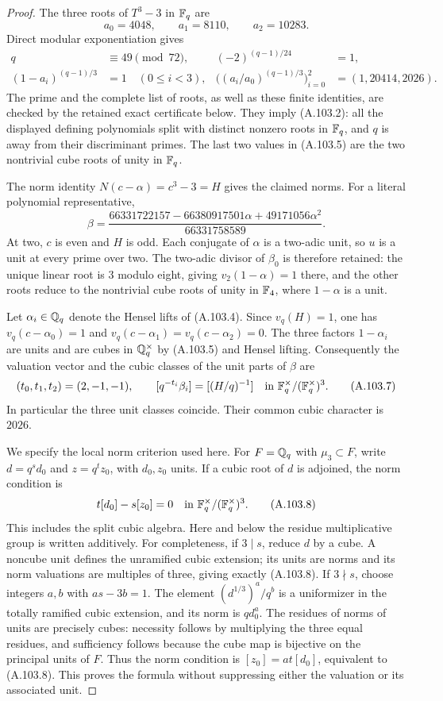 \begin{proof}
The three roots of $T^3-3$ in $\mathbb F_q$ are
\[
       a_0=4048,\qquad a_1=8110,\qquad a_2=10283.
 \tag{A.103.4}
\]
Direct modular exponentiation gives
\[
 \begin{aligned}
 q&\equiv49\pmod{72},&
 (-2)^{(q-1)/24}&=1,\\
 (1-a_i)^{(q-1)/3}&=1\quad(0\le i<3),&
 \bigl((a_i/a_0)^{(q-1)/3}\bigr)_{i=0}^2
     &=(1,20414,2026).
 \end{aligned}
 \tag{A.103.5}
\]
The prime and the complete list of roots, as well as these
finite identities, are checked by the retained exact
certificate below.
They imply (A.103.2): all the displayed defining
polynomials split with distinct nonzero roots in
$\mathbb F_q$, and $q$ is away from their discriminant primes.
The last two values in (A.103.5) are the two nontrivial
cube roots of unity in $\mathbb F_q$.

The norm identity $N(c-\alpha)=c^3-3=H$ gives the
claimed norms.
For a literal polynomial representative,
\[
 \beta=\frac{
  66331722157-66380917501\alpha+49171056\alpha^2}
 {66331758589}.
 \tag{A.103.6}
\]
At two, $c$ is even and $H$ is odd.
Each conjugate of $\alpha$ is a two-adic unit, so $u$
is a unit at every prime over two.
The two-adic divisor of $\beta_0$ is therefore retained:
the unique linear root is $3$ modulo eight, giving
$v_2(1-\alpha)=1$ there, and the other roots reduce
to the nontrivial cube roots of unity in $\mathbb F_4$,
where $1-\alpha$ is a unit.

Let $\alpha_i\in\mathbb Q_q$ denote the Hensel lifts of
(A.103.4).
Since $v_q(H)=1$, one has
$v_q(c-\alpha_0)=1$ and
$v_q(c-\alpha_1)=v_q(c-\alpha_2)=0$.
The three factors $1-\alpha_i$ are units and are
cubes in $\mathbb Q_q^\times$ by (A.103.5) and Hensel lifting.
Consequently the valuation vector and the cubic
classes of the unit parts of $\beta$ are
\[
 (t_0,t_1,t_2)=(2,-1,-1),\qquad
 [q^{-t_i}\beta_i]=[(H/q)^{-1}]
       \quad\hbox{in }\mathbb F_q^\times/(\mathbb F_q^\times)^3.
 \tag{A.103.7}
\]
In particular the three unit classes coincide.
Their common cubic character is $2026$.

We specify the local norm criterion used here.
For $F=\mathbb Q_q$ with $\mu_3\subset F$, write
$d=q^s d_0$ and $z=q^t z_0$, with $d_0,z_0$ units.
If a cubic root of $d$ is adjoined, the norm condition is
\[
       t[d_0]-s[z_0]=0
          \quad\hbox{in }\mathbb F_q^\times/(\mathbb F_q^\times)^3.
 \tag{A.103.8}
\]
This includes the split cubic algebra.
Here and below the residue multiplicative group is
written additively.
For completeness, if $3\mid s$, reduce $d$ by a cube.
A noncube unit defines the unramified cubic extension;
its units are norms and its norm valuations are
multiples of three, giving exactly (A.103.8).
If $3\nmid s$, choose integers $a,b$ with $as-3b=1$.
The element $(d^{1/3})^a/q^b$ is a uniformizer in
the totally ramified cubic extension, and its norm is
$q d_0^a$.
The residues of norms of units are precisely cubes:
necessity follows by multiplying the three equal
residues, and sufficiency follows because the cube
map is bijective on the principal units of $F$.
Thus the norm condition is
$[z_0]=at[d_0]$, equivalent to (A.103.8).
This proves the formula without suppressing either
the valuation or its associated unit.


\end{proof}
